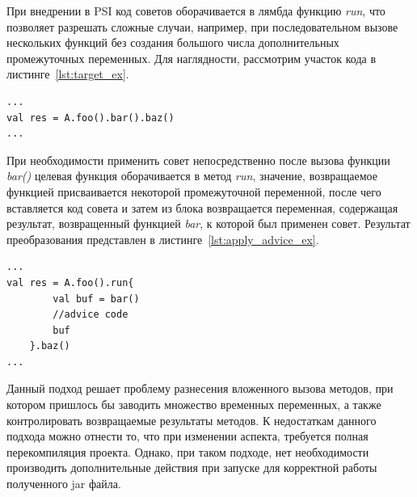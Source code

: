 \documentclass[conference]{IEEEtran}
\begin{document}
При внедрении в PSI код советов оборачивается в лямбда функцию \textit{run}, что
позволяет разрешать сложные случаи, например, при последовательном вызове
нескольких функций без создания большого числа дополнительных 
промежуточных переменных.
Для наглядности, рассмотрим участок кода в листинге~\ref{lst:target_ex}.
\begin{lstlisting}[label=lst:target_ex,
    caption={Пример целевой точки внедрения}]
...
val res = A.foo().bar().baz()
...
\end{lstlisting}
При необходимости применить совет непосредственно после вызова функции 
\textit{bar()} целевая функция оборачивается в метод \textit{run}, значение, 
возвращаемое функцией присваивается некоторой промежуточной переменной, после 
чего вставляется код совета и затем из блока возвращается переменная, 
содержащая результат, возвращенный функцией \textit{bar}, к которой был применен
совет.
Результат преобразования представлен в листинге~\ref{lst:apply_advice_ex}.
\begin{lstlisting}[label=lst:apply_advice_ex,
    caption={Пример внедрения кода с использованием функции run}]
...
val res = A.foo().run{
        val buf = bar()
        //advice code
        buf
    }.baz()
...
\end{lstlisting}

Данный подход решает проблему разнесения вложенного вызова методов, при котором 
пришлось бы заводить множество временных переменных, а также контролировать 
возвращаемые результаты методов.
К недостаткам данного подхода можно отнести то, что при изменении аспекта,
требуется полная перекомпиляция проекта.
Однако, при таком подходе, нет необходимости производить дополнительные действия
при запуске для корректной работы полученного jar файла.

\end{document}
